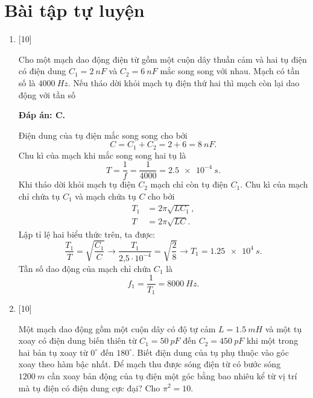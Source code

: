 \section{Bài tập tự luyện}
\begin{enumerate}[label=\bfseries Câu \arabic*:]
	
	\item {} [10]
	
	{Cho một mạch dao động điện từ gồm một cuộn dây thuần cảm và hai tụ điện có điện dung $C_1 = \SI{2}{nF}$ và $C_2 = \SI{6}{nF}$ mắc song song với nhau. Mạch có tần số là $\SI{4000}{Hz}$. Nếu  tháo dời khỏi mạch tụ điện thứ hai thì mạch còn lại dao động với tần số
	}
	
	\hideall
	{		\textbf{Đáp án: C.}
		
		Điện dung của tụ điện mắc song song cho bởi
		$$
		C=C_{1}+C_{2}=2+6= \SI{8}{nF}.
		$$
		Chu kì của mạch khi mắc song song hai tụ là
		$$
		T=\dfrac{1}{f}=\dfrac{1}{4000}= \SI{2,5 e-4}{s}.
		$$
		Khi tháo dời khỏi mạch tụ điện $C_{2}$ mạch chỉ còn tụ điện $C_{1}$. Chu kì của mạch chỉ chứa tụ $C_{1}$ và mạch chứa tụ $C$ cho bởi
		$$
		\begin{aligned}
			T_{1} &=2 \pi \sqrt{L C_{1}}, \\
			T &=2 \pi \sqrt{L C}.
		\end{aligned}
		$$
		Lập tỉ lệ hai biểu thức trên, ta được:
		$$
		\dfrac{T_{1}}{T}=\sqrt{\dfrac{C_{1}}{C}} \rightarrow \dfrac{T_{1}}{\text{2,5} \cdot 10^{-4}}=\sqrt{\dfrac{2}{8}} \rightarrow T_{1}= \SI{1,25 e4}{s}.
		$$
		Tần số dao động của mạch chỉ chứa $C_{1}$ là
		$$
		f_{1}=\dfrac{1}{T_{1}}= \SI{8000}{Hz}.
		$$	
	}
	
	
	\item {} [10]
	
	{Một mạch dao động gồm một cuộn dây có độ tự cảm $L = \SI{1,5}{mH}$ và một tụ xoay có điện dung biến thiên từ $C_1 = \SI{50}{pF}$ đến $C_2 = \SI{450}{pF}$ khi một trong hai bản tụ xoay từ $0^\circ$ đến $180^\circ$. Biết điện dung của tụ phụ thuộc vào góc xoay theo hàm bậc nhất. Để mạch thu được sóng điện từ có bước sóng $\SI{1200}{m}$ cần xoay bản động của tụ điện một góc bằng bao nhiêu kể từ vị trí mà tụ điện có điện dung cực đại? Cho $\pi^2 = 10$.
	}
	

\end{enumerate}
